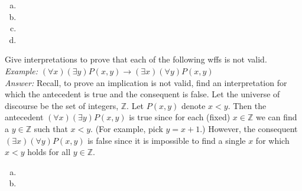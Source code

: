 \documentclass[addpoints,12pt]{exam}
\theoremstyle{remark}
\newcommand{\Z}{\ensuremath{\mathbb Z}}
\newcommand{\meet}{\ensuremath{\wedge}}
\newcommand{\onlyif}{\ensuremath{\rightarrow}}
\renewcommand{\iff}{\ensuremath{\leftrightarrow}}
\begin{document}
\begin{questions}

  \medskip

  \begin{enumerate}[(a)]
    \item %
    \vskip5mm
    \item %
    \vskip25mm
    \item %
    \vskip25mm
    \item %
    \vskip25mm
  \end{enumerate}

  \newpage

  \question[4] %
  Give interpretations to prove that each of the following wffs is not valid.
  \\[8pt]
  {\it Example:} $(\forall x)(\exists y)P(x,y) \onlyif (\exists x)(\forall y)P(x,y)$
  \\[8pt]
  {\it Answer:} 
  Recall, to prove an implication is not valid, find 
  an interpretation for which the antecedent is true and the consequent is false.
  Let the universe of discourse be the set of integers, $\Z$.  
  Let $P(x,y)$ denote $x<y$.  Then the antecedent
  $(\forall x)(\exists y)P(x,y)$ is true since for each (fixed) $x\in \Z$ we 
  can find a $y\in \Z$ such that $x<y$. (For example, pick $y = x+1$.)
  However, the consequent $(\exists x)(\forall y)P(x,y)$ is false since it is 
  impossible to find a single $x$ for which $x<y$ holds for all $y\in \Z$.
  \\
  \medskip
  \begin{enumerate}[(a)]
  \item
  \item
    \vskip6cm
  \end{enumerate}


\end{questions}
\end{document}
